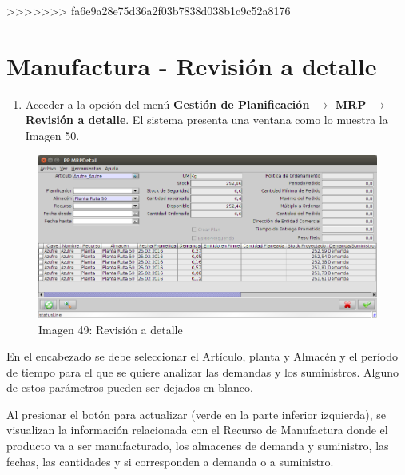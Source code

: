 \documentclass[letterpaper,10pt,spanish]{sphinxmanual}
\begin{document}
\textgreater{}\textgreater{}\textgreater{}\textgreater{}\textgreater{}\textgreater{}\textgreater{} fa6e9a28e75d36a2f03b7838d038b1c9c52a8176


\section{Manufactura - Revisión a detalle}
\label{manufactura-revision::doc}\label{manufactura-revision:manufactura-revision-a-detalle}\begin{enumerate}
\item {} 
Acceder a la opción del menú \textbf{Gestión de Planificación \(\rightarrow\)  MRP \(\rightarrow\) Revisión a detalle}. El sistema presenta una ventana como lo muestra la Imagen 50.

\end{enumerate}
\begin{figure}[htbp]
\centering
\capstart

\includegraphics{ly_revision.png}
\caption{Imagen 49: Revisión a detalle}\end{figure}

En el encabezado se debe seleccionar el Artículo, planta y Almacén y el período de tiempo para el que se quiere analizar las demandas y los suministros. Alguno de estos parámetros pueden ser dejados en blanco.

Al presionar el botón para actualizar (verde en la parte inferior izquierda), se visualizan la información relacionada con el Recurso de Manufactura donde el producto va a ser manufacturado, los almacenes de demanda y suministro, las fechas, las cantidades y si corresponden a demanda o a suministro.
\end{document}
